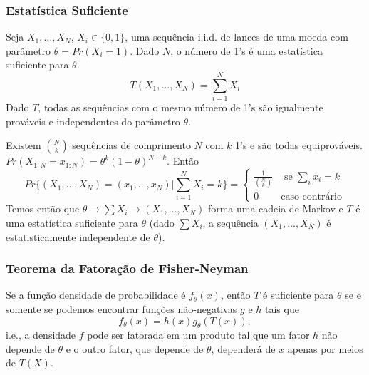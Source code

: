 \begin{frame}[allowframebreaks]
  \frametitle{Estatística Suficiente}
  \begin{example}
  Seja $X_1, \ldots, X_N$, $X_i \in \{0,1\}$, uma sequência i.i.d. de lances de uma moeda 
  com parâmetro $\theta = Pr(X_i=1)$. Dado $N$, o número de 1's é uma estatística suficiente
  para $\theta$.
  \begin{equation}
  T(X_1, \ldots, X_N) = \sum_{i=1}^{N} X_i
  \end{equation}
  Dado $T$, todas as sequências com o mesmo número de 1's são igualmente prováveis e independentes
  do parâmetro $\theta$.

  \examplebreak

  Existem ${N \choose k}$ sequências de comprimento $N$ com $k$ 1's e são todas equiprováveis.
  $Pr(X_{1:N} = x_{1:N}) = \theta^k (1-\theta)^{N-k}$. Então
  \begin{equation}
  Pr\{(X_1,\ldots,X_N)=(x_1,\ldots,x_N) | \sum_{i=1}^N X_i = k\} = 
        \begin{cases} 
                \frac{1}{{N \choose k}} &  \text{ se } \sum_i x_i = k \\
                0       & \text{caso contrário}
        \end{cases}
  \end{equation}
  Temos então que $\theta \rightarrow \sum X_i \rightarrow (X_1,\ldots,X_N)$ forma uma cadeia de Markov
  e $T$ é uma estatística suficiente para $\theta$ (dado $\sum X_i$, a sequência $(X_1,\ldots,X_N)$ é
  estatisticamente independente de $\theta$).
  \end{example}
\end{frame}


\begin{frame}[allowframebreaks]
  \frametitle{Teorema da Fatoração de Fisher-Neyman}
  \begin{theorem}
  Se a função densidade de probabilidade é $f_\theta (x)$, então $T$ é suficiente para $\theta$
  se e somente se podemos encontrar funções não-negativas $g$ e $h$ tais que
  \begin{equation}
  f_\theta (x) = h(x) g_\theta (T(x)) ,
  \end{equation}
  i.e., a densidade $f$ pode ser fatorada em um produto tal que um fator $h$ não depende de $\theta$
  e o outro fator, que depende de $\theta$, dependerá de $x$ apenas por meios de $T(X)$.
  \end{theorem}
\end{frame}

